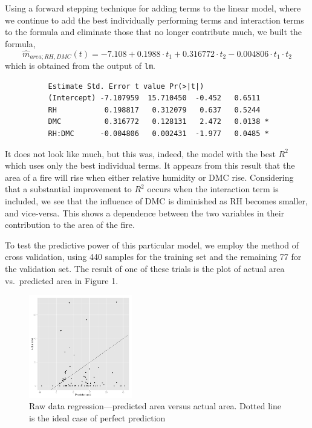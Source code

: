 \documentclass{article}
\begin{document}
Using a forward stepping technique for adding terms to the linear model, where
we continue to add the best individually performing terms and interaction terms 
to the formula and eliminate those that no longer contribute much, we built the
formula,
\begin{equation}
  \widehat{m}_{area;RH,DMC}(t) = -7.108 + 0.1988 \cdot t_1 + 0.316772 \cdot t_2
  - 0.004806 \cdot t_1 \cdot t_2
\end{equation}
which is obtained from the output of \verb=lm=.

\begin{verbatim}
          Estimate Std. Error t value Pr(>|t|)  
          (Intercept) -7.107959  15.710450  -0.452   0.6511  
          RH           0.198817   0.312079   0.637   0.5244  
          DMC          0.316772   0.128131   2.472   0.0138 *
          RH:DMC      -0.004806   0.002431  -1.977   0.0485 *
\end{verbatim}

It does not look like much, but this was, indeed, the model with the best $R^2$
which uses only the best individual terms. It appears from this result that the
area of a fire will rise when either relative humidity or DMC rise. Considering
that a substantial improvement to $R^2$ occurs when the interaction term is
included, we see that the influence of DMC is diminished as RH becomes smaller,
and vice-versa. This shows a dependence between the two variables in their
contribution to the area of the fire.

To test the predictive power of this particular model, we employ the method of
cross validation, using 440 samples for the training set and the remaining 77
for the validation set. The result of one of these trials is the plot of actual
area vs.\ predicted area in Figure 1.

\begin{figure}
  \centering
  \includegraphics[width=0.4\textwidth]{firenaivepredict.jpg}
  \caption{Raw data regression---predicted area versus actual area. Dotted line
  is the ideal case of perfect prediction}
\end{figure}
\end{document}

